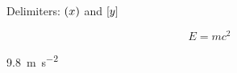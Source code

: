 \documentclass{scrartcl}
\begin{document}

Delimiters: $(x)$ and $[y]$

\begin{equation}
  E = mc^{2} \tag{1}
\end{equation}

\qty{9.8}{\meter\per\second\squared}
\end{document}
